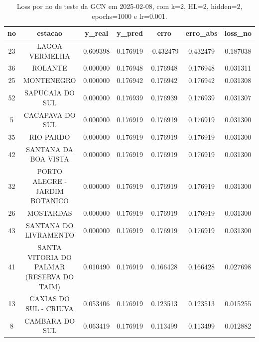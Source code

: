 \begin{table}[h]
\centering
\caption{Loss por no de teste da GCN em 2025-02-08, com k=2, HL=2, hidden=2, epochs=1000 e lr=0.001.}
\label{tab:gcn_loss_k2_hl2_h2_e1000_d20250208}
\begin{tabular}{ccccccc}
\toprule
no & estacao & y\_real & y\_pred & erro & erro\_abs & loss\_no \\
\midrule
23 & LAGOA VERMELHA & 0.609398 & 0.176919 & -0.432479 & 0.432479 & 0.187038 \\
36 & ROLANTE & 0.000000 & 0.176948 & 0.176948 & 0.176948 & 0.031311 \\
25 & MONTENEGRO & 0.000000 & 0.176942 & 0.176942 & 0.176942 & 0.031308 \\
52 & SAPUCAIA DO SUL & 0.000000 & 0.176939 & 0.176939 & 0.176939 & 0.031307 \\
5 & CACAPAVA DO SUL & 0.000000 & 0.176919 & 0.176919 & 0.176919 & 0.031300 \\
35 & RIO PARDO & 0.000000 & 0.176919 & 0.176919 & 0.176919 & 0.031300 \\
42 & SANTANA DA BOA VISTA & 0.000000 & 0.176919 & 0.176919 & 0.176919 & 0.031300 \\
32 & PORTO ALEGRE - JARDIM BOTANICO & 0.000000 & 0.176919 & 0.176919 & 0.176919 & 0.031300 \\
26 & MOSTARDAS & 0.000000 & 0.176919 & 0.176919 & 0.176919 & 0.031300 \\
43 & SANTANA DO LIVRAMENTO & 0.000000 & 0.176919 & 0.176919 & 0.176919 & 0.031300 \\
41 & SANTA VITORIA DO PALMAR (RESERVA DO TAIM) & 0.010490 & 0.176919 & 0.166428 & 0.166428 & 0.027698 \\
13 & CAXIAS DO SUL - CRIUVA & 0.053406 & 0.176919 & 0.123513 & 0.123513 & 0.015255 \\
8 & CAMBARA DO SUL & 0.063419 & 0.176919 & 0.113499 & 0.113499 & 0.012882 \\
\bottomrule
\end{tabular}
\end{table}
